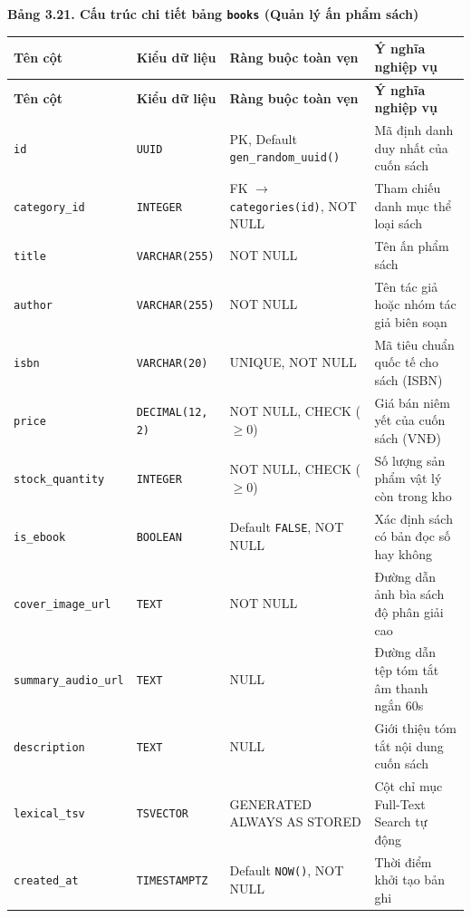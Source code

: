 \documentclass[11pt, a4paper]{report}
\begin{document}
\vspace{0.3cm}
\noindent\textbf{Bảng 3.21. Cấu trúc chi tiết bảng \texttt{books} (Quản lý ấn phẩm sách)}

\begin{longtable}{p{3.2cm} p{2.6cm} p{4.0cm} p{4.5cm}}
\toprule
\textbf{Tên cột} & \textbf{Kiểu dữ liệu} & \textbf{Ràng buộc toàn vẹn} & \textbf{Ý nghĩa nghiệp vụ} \\
\midrule
\endfirsthead
\toprule
\textbf{Tên cột} & \textbf{Kiểu dữ liệu} & \textbf{Ràng buộc toàn vẹn} & \textbf{Ý nghĩa nghiệp vụ} \\
\midrule
\endhead
\bottomrule
\endfoot
\texttt{id} & \texttt{UUID} & PK, Default \texttt{gen\_random\_uuid()} & Mã định danh duy nhất của cuốn sách \\
\midrule
\texttt{category\_id} & \texttt{INTEGER} & FK $\rightarrow$ \texttt{categories(id)}, NOT NULL & Tham chiếu danh mục thể loại sách \\
\midrule
\texttt{title} & \texttt{VARCHAR(255)} & NOT NULL & Tên ấn phẩm sách \\
\midrule
\texttt{author} & \texttt{VARCHAR(255)} & NOT NULL & Tên tác giả hoặc nhóm tác giả biên soạn \\
\midrule
\texttt{isbn} & \texttt{VARCHAR(20)} & UNIQUE, NOT NULL & Mã tiêu chuẩn quốc tế cho sách (ISBN) \\
\midrule
\texttt{price} & \texttt{DECIMAL(12, 2)} & NOT NULL, CHECK ($\ge 0$) & Giá bán niêm yết của cuốn sách (VNĐ) \\
\midrule
\texttt{stock\_quantity} & \texttt{INTEGER} & NOT NULL, CHECK ($\ge 0$) & Số lượng sản phẩm vật lý còn trong kho \\
\midrule
\texttt{is\_ebook} & \texttt{BOOLEAN} & Default \texttt{FALSE}, NOT NULL & Xác định sách có bản đọc số hay không \\
\midrule
\texttt{cover\_image\_url}& \texttt{TEXT} & NOT NULL & Đường dẫn ảnh bìa sách độ phân giải cao \\
\midrule
\texttt{summary\_audio\_url}& \texttt{TEXT} & NULL & Đường dẫn tệp tóm tắt âm thanh ngắn 60s \\
\midrule
\texttt{description} & \texttt{TEXT} & NULL & Giới thiệu tóm tắt nội dung cuốn sách \\
\midrule
\texttt{lexical\_tsv} & \texttt{TSVECTOR} & GENERATED ALWAYS AS STORED & Cột chỉ mục Full-Text Search tự động \\
\midrule
\texttt{created\_at} & \texttt{TIMESTAMPTZ} & Default \texttt{NOW()}, NOT NULL & Thời điểm khởi tạo bản ghi \\
\bottomrule
\end{longtable}
\end{document}
